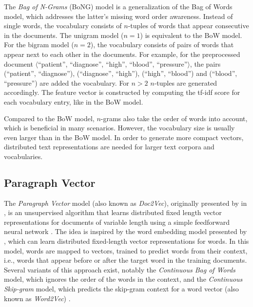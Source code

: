 The \textit{Bag of N-Grams} (BoNG) model is a generalization of the Bag of Words model, which addresses the latter’s missing word order awareness.
Instead of single words, the vocabulary consists of $n$-tuples of words that appear consecutive in the documents.
The unigram model ($n=1$) is equivalent to the BoW model.
For the bigram model ($n=2$), the vocabulary consists of pairs of words that appear next to each other in the documents.
For example, for the preprocessed document $\langle$\enquote{patient},  \enquote{diagnose},  \enquote{high},  \enquote{blood},  \enquote{pressure}$\rangle$, the pairs (\enquote{patient},  \enquote{diagnose}), (\enquote{diagnose},  \enquote{high}), (\enquote{high},  \enquote{blood}) and (\enquote{blood},  \enquote{pressure}) are added the vocabulary.
For $n>2$ $n$-tuples are generated accordingly.
The feature vector is constructed by computing the tf-idf score for each vocabulary entry, like in the BoW model.

Compared to the BoW model, $n$-grams also take the order of words into account, which is beneficial in many scenarios.
However, the vocabulary size is usually even larger than in the BoW model.
In order to generate more compact vectors, distributed text representations are needed for larger text corpora and vocabularies.

\subsection{Paragraph Vector}

The \textit{Paragraph Vector} model (also known as \textit{Doc2Vec}), originally presented by \citeauthor{DBLP:conf/icml/LeM14} in \citeyear{DBLP:conf/icml/LeM14}, is an unsupervised algorithm that learns distributed fixed length vector representations for documents of variable length using a simple feedforward neural network \cite{DBLP:conf/icml/LeM14}.
The idea is inspired by the word embedding model presented by \citeauthor{DBLP:journals/jmlr/BengioDVJ03} \cite{DBLP:journals/jmlr/BengioDVJ03}, which can learn distributed fixed-length vector representations for words.
In this model, words are mapped to vectors, trained to predict words from their context, i.e., words that appear before or after the target word in the training documents.
Several variants of this approach exist, notably the \textit{Continuous Bag of Words} model, which ignores the order of the words in the context, and the \textit{Continuous Skip-gram} model, which predicts the skip-gram context for a word vector (also known as \textit{Word2Vec}) \cite{DBLP:journals/corr/abs-1301-3781}.

